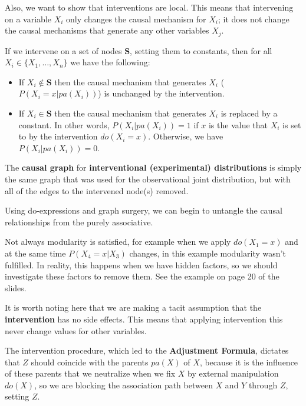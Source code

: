 Also, we want to show that interventions are local. This means that intervening on
a variable $X_i$ only changes the causal mechanism for $X_i$; it does not change
the causal mechanisms that generate any other variables $X_j$.
\begin{definition}
      If we intervene on a set of nodes $\mathbf{S}$, setting them to constants,
      then for all $X_i \in \{X_1, \ldots, X_n\}$ we have the following:
      \begin{itemize}
            \item If $X_i \notin \mathbf{S}$ then the causal mechanism that generates
                  $X_i$ ($P(X_i = x | pa(X_i))$) is unchanged by the intervention.
            \item If $X_i \in \mathbf{S}$ then the causal mechanism that generates
                  $X_i$ is replaced by a constant. In other words, $P(X_i | pa(X_i)) = 1$
                  if $x$ is the value that $X_i$ is set to by the intervention
                  $do(X_i = x)$. Otherwise, we have $P(X_i | pa(X_i)) = 0$.
      \end{itemize}
\end{definition}
\begin{note}
      The \textbf{causal graph} for \textbf{interventional (experimental) distributions}
      is simply the same graph that was used for the observational joint distribution,
      but with all of the edges to the intervened node(s) removed.
\end{note}
Using do-expressions and graph surgery, we can begin to untangle the causal
relationships from the purely associative.

Not always modularity is satisfied, for example when we apply $do(X_1 = x)$
and at the same time $P(X_4 = x| X_3)$ changes, in this example modularity wasn't
fulfilled. In reality, this happens when we have hidden factors, so we should
investigate these factors to remove them. See the example on page 20 of the slides.

\begin{note}
      It is worth noting here that we are making a tacit assumption that the
      \textbf{intervention} has no side effects. This means that applying
      intervention this never change values for other variables.
\end{note}

The intervention procedure, which led to the \textbf{Adjustment Formula}, dictates
that $Z$ should coincide with the parents $pa(X)$ of $X$, because it is the
influence of these parents that we neutralize when we fix $X$ by external manipulation
$do(X)$, so we are blocking the association path between $X$ and $Y$ through $Z$,
setting $Z$.

